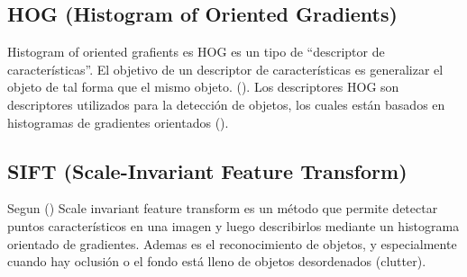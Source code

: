 \subsection{HOG (Histogram of Oriented Gradients)}
Histogram of oriented grafients es HOG es un tipo de “descriptor de características”. El objetivo de un descriptor de características es generalizar el objeto de tal forma que el mismo objeto. (\citet{pardoHOG}). Los descriptores HOG son descriptores utilizados para la detección de objetos, los cuales están basados en histogramas de gradientes orientados (\citep{avilaHOG}).

\subsection{SIFT (Scale-Invariant Feature Transform)}

Segun (\cite{AlegreFernandez2018}) Scale invariant feature transform es un método que permite detectar puntos característicos en una imagen y luego describirlos mediante un histograma orientado de gradientes. Ademas es el reconocimiento de objetos, y especialmente cuando hay oclusión o el fondo está lleno de objetos desordenados (clutter).


